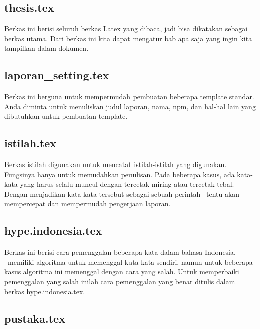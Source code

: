 \chapter{\babEmpat}

\section{thesis.tex}

Berkas ini berisi seluruh berkas Latex yang dibaca, jadi bisa dikatakan sebagai berkas utama. Dari berkas ini kita dapat mengatur bab apa saja yang ingin kita tampilkan dalam dokumen.

\section{laporan\_setting.tex}

Berkas ini berguna untuk mempermudah pembuatan beberapa template standar. 
Anda diminta untuk menuliskan judul laporan, nama, npm, dan hal-hal lain yang 
dibutuhkan untuk pembuatan template. 

\section{istilah.tex}

Berkas istilah digunakan untuk mencatat istilah-istilah yang digunakan. Fungsinya hanya untuk memudahkan penulisan.
Pada beberapa kasus, ada kata-kata yang harus selalu muncul dengan tercetak miring atau tercetak tebal. Dengan menjadikan kata-kata tersebut sebagai sebuah perintah \latex~tentu akan mempercepat dan mempermudah pengerjaan laporan. 

\section{hype.indonesia.tex}

Berkas ini berisi cara pemenggalan beberapa kata dalam bahasa Indonesia. \latex~memiliki algoritma untuk memenggal kata-kata sendiri, namun untuk beberapa kasus algoritma ini memenggal dengan cara yang salah. Untuk memperbaiki pemenggalan yang salah inilah cara pemenggalan yang benar ditulis dalam berkas hype.indonesia.tex.

\section{pustaka.tex}

